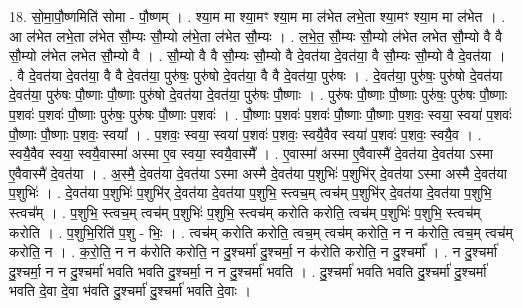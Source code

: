 \documentclass[17pt]{extarticle}
\begin{document}
18. सो॒मा॒पौ॒ष्णमिति॑ सोमा - पौ॒ष्णम् । . श्या॒म मा श्या॒मꣳ श्या॒म मा ल॑भेत लभे॒ता श्या॒मꣳ श्या॒म मा ल॑भेत । . आ ल॑भेत लभे॒ता ल॑भेत सौ॒म्यः सौ॒म्यो ल॑भे॒ता ल॑भेत सौ॒म्यः । . ल॒भे॒त॒ सौ॒म्यः सौ॒म्यो ल॑भेत लभेत सौ॒म्यो वै वै सौ॒म्यो ल॑भेत लभेत सौ॒म्यो वै । . सौ॒म्यो वै वै सौ॒म्यः सौ॒म्यो वै दे॒वत॑या दे॒वत॑या॒ वै सौ॒म्यः सौ॒म्यो वै दे॒वत॑या । . वै दे॒वत॑या दे॒वत॑या॒ वै वै दे॒वत॑या॒ पुरु॑षः॒ पुरु॑षो दे॒वत॑या॒ वै वै दे॒वत॑या॒ पुरु॑षः । . दे॒वत॑या॒ पुरु॑षः॒ पुरु॑षो दे॒वत॑या दे॒वत॑या॒ पुरु॑षः पौ॒ष्णाः पौ॒ष्णाः पुरु॑षो दे॒वत॑या दे॒वत॑या॒ पुरु॑षः पौ॒ष्णाः । . पुरु॑षः पौ॒ष्णाः पौ॒ष्णाः पुरु॑षः॒ पुरु॑षः पौ॒ष्णाः प॒शवः॑ प॒शवः॑ पौ॒ष्णाः पुरु॑षः॒ पुरु॑षः पौ॒ष्णाः प॒शवः॑ । . पौ॒ष्णाः प॒शवः॑ प॒शवः॑ पौ॒ष्णाः पौ॒ष्णाः प॒शवः॒ स्वया॒ स्वया॑ प॒शवः॑ पौ॒ष्णाः पौ॒ष्णाः प॒शवः॒ स्वया᳚ । . प॒शवः॒ स्वया॒ स्वया॑ प॒शवः॑ प॒शवः॒ स्वयै॒वैव स्वया॑ प॒शवः॑ प॒शवः॒ स्वयै॒व । . स्वयै॒वैव स्वया॒ स्वयै॒वास्मा॑ अस्मा ए॒व स्वया॒ स्वयै॒वास्मै᳚ । . ए॒वास्मा॑ अस्मा ए॒वैवास्मै॑ दे॒वत॑या दे॒वत॑या ऽस्मा ए॒वैवास्मै॑ दे॒वत॑या । . अ॒स्मै॒ दे॒वत॑या दे॒वत॑या ऽस्मा अस्मै दे॒वत॑या प॒शुभिः॑ प॒शुभि॑र् दे॒वत॑या ऽस्मा अस्मै दे॒वत॑या प॒शुभिः॑ । . दे॒वत॑या प॒शुभिः॑ प॒शुभि॑र् दे॒वत॑या दे॒वत॑या प॒शुभि॒ स्त्वच॒म् त्वच॑म् प॒शुभि॑र् दे॒वत॑या दे॒वत॑या प॒शुभि॒ स्त्वच᳚म् । . प॒शुभि॒ स्त्वच॒म् त्वच॑म् प॒शुभिः॑ प॒शुभि॒ स्त्वच॑म् करोति करोति॒ त्वच॑म् प॒शुभिः॑ प॒शुभि॒ स्त्वच॑म् करोति । . प॒शुभि॒रिति॑ प॒शु - भिः॒ । . त्वच॑म् करोति करोति॒ त्वच॒म् त्वच॑म् करोति॒ न न क॑रोति॒ त्वच॒म् त्वच॑म् करोति॒ न । . क॒रो॒ति॒ न न क॑रोति करोति॒ न दु॒श्चर्मा॑ दु॒श्चर्मा॒ न क॑रोति करोति॒ न दु॒श्चर्मा᳚ । . न दु॒श्चर्मा॑ दु॒श्चर्मा॒ न न दु॒श्चर्मा॑ भवति भवति दु॒श्चर्मा॒ न न दु॒श्चर्मा॑ भवति । . दु॒श्चर्मा॑ भवति भवति दु॒श्चर्मा॑ दु॒श्चर्मा॑ भवति दे॒वा दे॒वा भ॑वति दु॒श्चर्मा॑ दु॒श्चर्मा॑ भवति दे॒वाः । \newline
\end{document}
